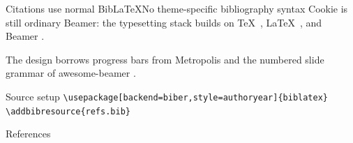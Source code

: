 \documentclass[aspectratio=169]{beamer}
\begin{document}
\begin{frame}{Citations use normal BibLaTeX}{No theme-specific bibliography syntax}
  Cookie is still ordinary Beamer: the typesetting stack builds on \TeX\ \parencite{knuth1984},
  \LaTeX\ \parencite{lamport1994}, and Beamer \parencite{tantau2025}.

  \vspace{.8em}
  The design borrows progress bars from Metropolis \parencite{metropolis} and the numbered
  slide grammar of awesome-beamer \parencite{awesomebeamer}.

  \vfill
  \begin{block}{Source setup}
    \texttt{\textbackslash usepackage[backend=biber,style=authoryear]\{biblatex\}}\\
    \texttt{\textbackslash addbibresource\{refs.bib\}}
  \end{block}
\end{frame}

\begin{frame}[allowframebreaks]{References}
  \printbibliography[heading=none]
\end{frame}
\end{document}
